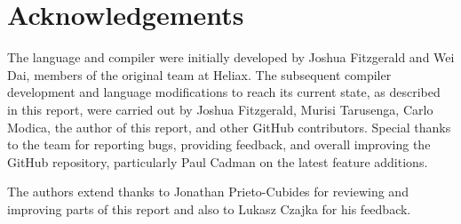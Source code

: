 \documentclass[
    9pt,            
    techreport,       
    affiltop,       
]{art}
\begin{document}
\section{Acknowledgements}

The \VampIR{} language and compiler were initially developed by Joshua Fitzgerald and Wei Dai, members of the original \VampIR{} team at Heliax. The subsequent compiler development and language modifications to reach its current state, as described in this report, were carried out by Joshua Fitzgerald, Murisi Tarusenga, Carlo Modica, the author of this report, and other GitHub contributors. Special thanks to the
\Juvix{} team for reporting bugs, providing feedback, and overall improving the GitHub repository, particularly Paul Cadman on the latest feature additions.

The authors extend thanks to Jonathan Prieto-Cubides for reviewing and improving parts of this report and also to Lukasz Czajka for his feedback.


\end{document}
